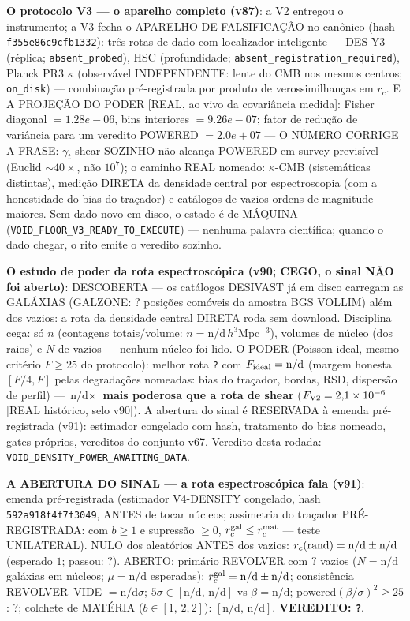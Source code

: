 \documentclass[11pt]{article}
\theoremstyle{definition}\newtheorem{deriv}{Derivação}
\begin{document}
\textbf{O protocolo V3 --- o aparelho completo (v87)}: a V2 entregou o instrumento; a V3 fecha o APARELHO DE FALSIFICAÇÃO no canônico (hash \texttt{f355e86c9cfb1332}): três rotas de dado com localizador inteligente --- DES Y3 (réplica; \texttt{absent\_probed}), HSC (profundidade; \texttt{absent\_registration\_required}), Planck PR3 $\kappa$ (observável INDEPENDENTE: lente do CMB nos mesmos centros; \texttt{on\_disk}) --- combinação pré-registrada por produto de verossimilhanças em $r_c$. E A PROJEÇÃO DO PODER [REAL, ao vivo da covariância medida]: Fisher diagonal $=1.28e-06$, bins interiores $=9.26e-07$; fator de redução de variância para um veredito POWERED $=2.0e+07$ --- O NÚMERO CORRIGE A FRASE: $\gamma_t$-shear SOZINHO não alcança POWERED em survey previsível (Euclid $\sim40\times$, não $10^7$); o caminho REAL nomeado: $\kappa$-CMB (sistemáticas distintas), medição DIRETA da densidade central por espectroscopia (com a honestidade do bias do traçador) e catálogos de vazios ordens de magnitude maiores. Sem dado novo em disco, o estado é de MÁQUINA (\texttt{VOID\_FLOOR\_V3\_READY\_TO\_EXECUTE}) --- nenhuma palavra científica; quando o dado chegar, o rito emite o veredito sozinho.

\textbf{O estudo de poder da rota espectroscópica (v90; CEGO, o sinal NÃO foi aberto)}: DESCOBERTA --- os catálogos DESIVAST já em disco carregam as GALÁXIAS (GALZONE: $?$ posições comóveis da amostra BGS VOLLIM) além dos vazios: a rota da densidade central DIRETA roda sem download. Disciplina cega: só $\bar n$ (contagens totais$/$volume: $\bar n=\text{n/d}\,h^3$Mpc$^{-3}$), volumes de núcleo (dos raios) e $N$ de vazios --- nenhum núcleo foi lido. O PODER (Poisson ideal, mesmo critério $F\ge25$ do protocolo): melhor rota \texttt{?} com $F_{\rm ideal}=\text{n/d}$ (margem honesta $[F/4,F]$ pelas degradações nomeadas: bias do traçador, bordas, RSD, dispersão de perfil) --- \textbf{$\text{n/d}\times$ mais poderosa que a rota de shear} ($F_{\rm V2}=2{,}1\times10^{-6}$ [REAL histórico, selo v90]). A abertura do sinal é RESERVADA à emenda pré-registrada (v91): estimador congelado com hash, tratamento do bias nomeado, gates próprios, vereditos do conjunto v67. Veredito desta rodada: \texttt{VOID\_DENSITY\_POWER\_AWAITING\_DATA}.

\textbf{A ABERTURA DO SINAL --- a rota espectroscópica fala (v91)}: emenda pré-registrada (estimador V4-DENSITY congelado, hash \texttt{592a918f4f7f3049}, ANTES de tocar núcleos; assimetria do traçador PRÉ-REGISTRADA: com $b\ge1$ e supressão $\ge0$, $r_c^{\rm gal}\le r_c^{\rm mat}$ --- teste UNILATERAL). NULO dos aleatórios ANTES dos vazios: $r_c({\rm rand})=\text{n/d}\pm\text{n/d}$ (esperado $1$; passou: ?). ABERTO: primário REVOLVER com $?$ vazios ($N=\text{n/d}$ galáxias em núcleos; $\mu=\text{n/d}$ esperadas): $r_c^{\rm gal}=\text{n/d}\pm\text{n/d}$; consistência REVOLVER--VIDE $=\text{n/d}\sigma$; $5\sigma\in[\text{n/d},\,\text{n/d}]$ vs $\beta=\text{n/d}$; powered$(\beta/\sigma)^2\ge25$: ?; colchete de MATÉRIA ($b\in[1,\,2{,}2]$): $[\text{n/d},\,\text{n/d}]$. \textbf{VEREDITO: \texttt{?}}.
\end{document}
